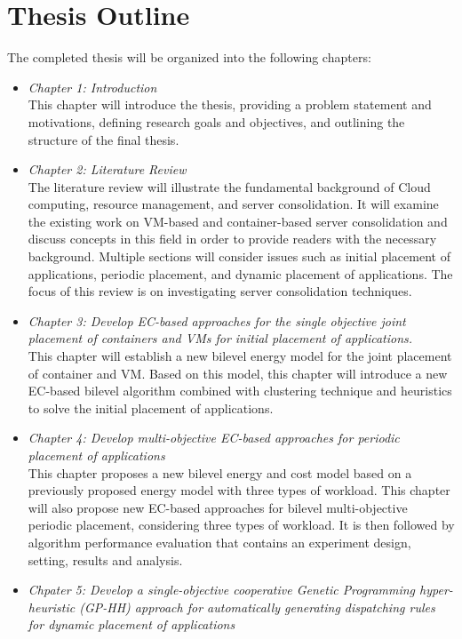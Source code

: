 \section{Thesis Outline}
The completed thesis will be organized into the following chapters:
\begin{itemize}
	\item \textit{Chapter 1: Introduction} \\
	This chapter will introduce the thesis, providing a problem statement and motivations, defining research goals and objectives, and outlining the structure of the final thesis.
	\item \textit{Chapter 2: Literature Review} \\
	The literature review will illustrate the fundamental background of Cloud computing, resource management, and server consolidation. It will examine the existing work on VM-based and container-based server consolidation and discuss concepts in this field in order to provide readers with the necessary background. Multiple sections will consider issues such as initial placement of applications, periodic placement, and dynamic placement of applications. The focus of this review is on investigating server consolidation techniques.
	\item \textit{Chapter 3: Develop EC-based approaches for the single objective joint placement of containers and VMs for initial placement of applications.} \\
	This chapter will establish a new bilevel energy model for the joint placement of container and VM. Based on this model, this chapter will introduce a new EC-based bilevel algorithm combined with clustering technique and heuristics to solve the initial placement of applications. 
	\item \textit{Chapter 4: Develop multi-objective EC-based approaches  for periodic placement of applications} \\
	This chapter proposes a new bilevel energy and cost model based on a previously proposed energy model with three types of workload.  This chapter will also propose new EC-based approaches for bilevel multi-objective periodic placement, considering three types of workload. It is then followed by algorithm performance evaluation that contains an experiment design, setting, results and analysis.
	\item \textit{Chpater 5: Develop a  single-objective cooperative Genetic Programming hyper-heuristic (GP-HH) approach for automatically generating dispatching rules for dynamic placement of applications} \\

\end{itemize}
